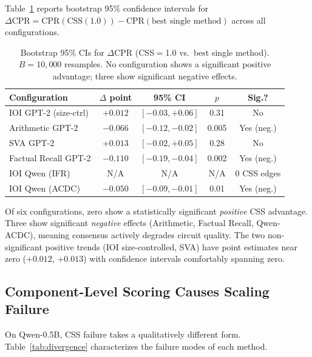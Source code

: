 \documentclass[11pt,a4paper]{article}
\begin{document}
Table~\ref{tab:bootstrap} reports bootstrap 95\% confidence intervals for $\Delta\text{CPR} = \text{CPR}(\text{CSS}(1.0)) - \text{CPR}(\text{best single method})$ across all configurations.

\begin{table}[t]
\centering
\small
\caption{Bootstrap 95\% CIs for $\Delta$CPR (CSS$=$1.0 vs.\ best single method). $B{=}10{,}000$ resamples. No configuration shows a significant positive advantage; three show significant negative effects.}
\label{tab:bootstrap}
\begin{tabular}{lcccc}
\toprule
\textbf{Configuration} & \textbf{$\Delta$ point} & \textbf{95\% CI} & \textbf{$p$} & \textbf{Sig.?} \\
\midrule
IOI GPT-2 (size-ctrl)       & $+0.012$ & $[-0.03, +0.06]$ & 0.31  & No \\
Arithmetic GPT-2            & $-0.066$ & $[-0.12, -0.02]$ & 0.005 & Yes (neg.) \\
SVA GPT-2                   & $+0.013$ & $[-0.02, +0.05]$ & 0.28  & No \\
Factual Recall GPT-2        & $-0.110$ & $[-0.19, -0.04]$ & 0.002 & Yes (neg.) \\
IOI Qwen (IFR)              & N/A      & N/A               & N/A   & 0 CSS edges \\
IOI Qwen (ACDC)             & $-0.050$ & $[-0.09, -0.01]$ & 0.01  & Yes (neg.) \\
\bottomrule
\end{tabular}
\end{table}

Of six configurations, zero show a statistically significant \emph{positive} CSS advantage. Three show significant \emph{negative} effects (Arithmetic, Factual Recall, Qwen-ACDC), meaning consensus actively degrades circuit quality. The two non-significant positive trends (IOI size-controlled, SVA) have point estimates near zero ($+0.012$, $+0.013$) with confidence intervals comfortably spanning zero.

\subsection{Component-Level Scoring Causes Scaling Failure}
\label{sec:scaling}

On Qwen-0.5B, CSS failure takes a qualitatively different form. Table~\ref{tab:divergence} characterizes the failure modes of each method.
\end{document}
